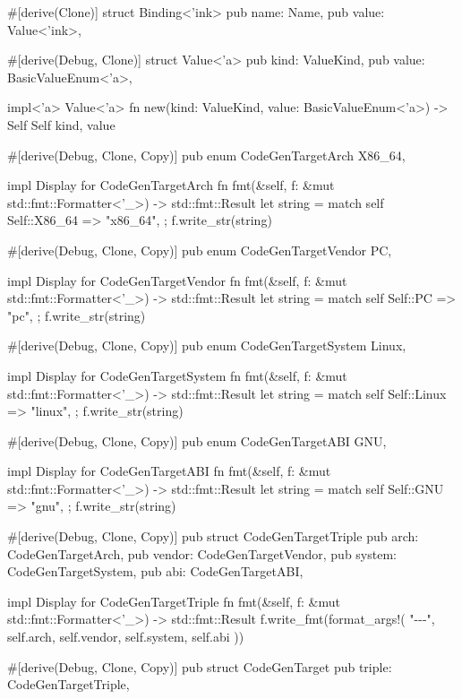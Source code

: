 \documentclass[
  oneside,
  english,
  coorientadorbanca,
  noabntexcite
]{ufsc-thesis-rn46-2019}
\begin{document}
\begin{rustcode}
#[derive(Clone)]
struct Binding<'ink> {
    pub name: Name,
    pub value: Value<'ink>,
}

#[derive(Debug, Clone)]
struct Value<'a> {
    pub kind: ValueKind,
    pub value: BasicValueEnum<'a>,
}

impl<'a> Value<'a> {
    fn new(kind: ValueKind, value: BasicValueEnum<'a>) -> Self {
        Self { kind, value }
    }
}

#[derive(Debug, Clone, Copy)]
pub enum CodeGenTargetArch {
    X86_64,
}

impl Display for CodeGenTargetArch {
    fn fmt(&self, f: &mut std::fmt::Formatter<'_>) -> std::fmt::Result {
        let string = match self {
            Self::X86_64 => "x86_64",
        };
        f.write_str(string)
    }
}

#[derive(Debug, Clone, Copy)]
pub enum CodeGenTargetVendor {
    PC,
}

impl Display for CodeGenTargetVendor {
    fn fmt(&self, f: &mut std::fmt::Formatter<'_>) -> std::fmt::Result {
        let string = match self {
            Self::PC => "pc",
        };
        f.write_str(string)
    }
}

#[derive(Debug, Clone, Copy)]
pub enum CodeGenTargetSystem {
    Linux,
}

impl Display for CodeGenTargetSystem {
    fn fmt(&self, f: &mut std::fmt::Formatter<'_>) -> std::fmt::Result {
        let string = match self {
            Self::Linux => "linux",
        };
        f.write_str(string)
    }
}

#[derive(Debug, Clone, Copy)]
pub enum CodeGenTargetABI {
    GNU,
}

impl Display for CodeGenTargetABI {
    fn fmt(&self, f: &mut std::fmt::Formatter<'_>) -> std::fmt::Result {
        let string = match self {
            Self::GNU => "gnu",
        };
        f.write_str(string)
    }
}

#[derive(Debug, Clone, Copy)]
pub struct CodeGenTargetTriple {
    pub arch: CodeGenTargetArch,
    pub vendor: CodeGenTargetVendor,
    pub system: CodeGenTargetSystem,
    pub abi: CodeGenTargetABI,
}

impl Display for CodeGenTargetTriple {
    fn fmt(&self, f: &mut std::fmt::Formatter<'_>) -> std::fmt::Result {
        f.write_fmt(format_args!(
            "{}-{}-{}-{}",
            self.arch, self.vendor, self.system, self.abi
        ))
    }
}

#[derive(Debug, Clone, Copy)]
pub struct CodeGenTarget {
    pub triple: CodeGenTargetTriple,
}


\end{rustcode}
\end{document}

